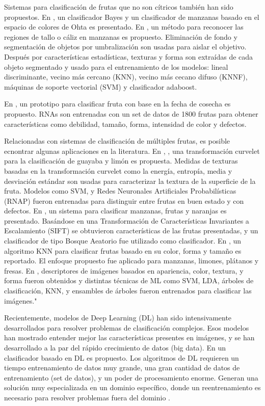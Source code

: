 \documentclass[twoside,spanish,ESP,MSc]{plantillaLabUPV}
\theoremstyle{definition}
\begin{document}
Sistemas para clasificación de frutas que no son cítricos también han sido propuestos. En \cite{rgbhisto}, un clasificador Bayes y un clasificador de manzanas basado en el espacio de colores de Ohta es presentado. En \cite{UNAY2007597}, un método para reconocer las regiones de tallo o cáliz en manzanas es propuesto. Eliminación de fondo y segmentación de objetos por umbralización son usadas para aislar el objetivo. Después por características estadísticas, texturas y forma son extraídas de cada objeto segmentado y usado para el entrenamiento de los modelos: lineal discriminante, vecino más cercano (KNN), vecino más cecano difuso (KNNF), máquinas de soporte vectorial (SVM) y clasificador adaboost.

En \cite{ALOHALI201129}, un prototipo para clasificar fruta con base en la fecha de cosecha es propuesto. RNAs son entrenadas con un set de datos de 1800 frutas para obtener características como debilidad, tamaño, forma, intensidad de color y defectos.

Relacionadas con sistemas de clasificación de múltiples frutas, es posible ecnontrar algunas aplicaciones en la literatura. En \cite{khoje}, , una transformación curvelet para la clasificación de guayaba y limón es propuesta. Medidas de texturas basadas en la transformación curvelet como la energía, entropía, media y desviación estándar son usadas para caracterizar la textura de la superficie de la fruta. Modelos como SVM, y Redes Neuronales Artificiales Probabilísticas (RNAP) fueron entrenadas para distinguir entre frutas en buen estado y con defectos. En \cite{7086191}, un sistema para clasificar manzanas, frutas y naranjas es presentado. Basándose en una Transformación de Características Invariantes a Escalamiento (SIFT) se obtuvieron características de las frutas presentadas, y un clasificador de tipo Bosque Aeatorio fue utilizado como clasificador. En \cite{5254804},  un algoritmo KNN para clasificar frutas basado en su color, forma y tamaño es reportado. El enfoque propuesto fue aplicado para manzanas, limones, plátanos y fresas. En  \cite{ROCHA201096}, descriptores de imágenes basados en apariencia, color, textura, y forma fueron obtenidos y distintas técnicas de ML como SVM, LDA, árboles de clasificación, KNN, y ensambles de árboles fueron entrenados para clasificar las imágenes."




Recientemente, modelos de Deep Learning (DL) han sido intensivamente desarrollados para resolver problemas de clasificación complejos. Esos modelos han mostrado entender mejor las características presentes en imágenes, y se han desarrollado a la par del rápido crecimiento de datos (big data). En \cite{8488544} un clasificador basado en DL es propuesto. Los algoritmos de DL requieren un tiempo entrenamiento de datos muy grande, una gran cantidad de datos de entrenamiento (set de datos), y un poder de procesamiento enorme. Generan una solución muy especializada en un dominio específico, donde un reentrenamiento es necesario para resolver problemas fuera del dominio \cite{dptarda}.
\end{document}
